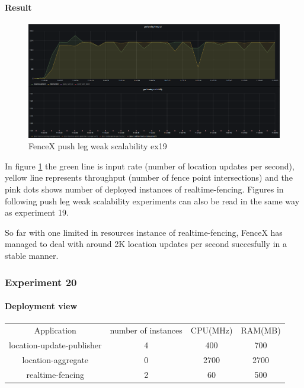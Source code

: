 \documentclass[a4]{report}
\begin{document}
    \paragraph{Result}
    \begin{figure}[ht]
        \caption{FenceX push leg weak scalability ex19}
        \label{fig:ex19}
        \includegraphics[scale=0.4]{images/evaluation/ex19-benchmarking-ongoing-1per16sec.png}
    \end{figure}

    In figure \ref{fig:ex19} the green line is input rate (number of location updates per second),
    yellow line represents throughput (number of fence point intersections) and the pink dots shows number of
    deployed instances of realtime-fencing.
    Figures in following push leg weak scalability experiments can also be read in the same way as experiment 19.

    So far with one limited in resources instance of realtime-fencing, FenceX has managed to deal with around 2K
    location updates per second succesfully in a stable manner.

    \subsubsection{Experiment 20}
    \paragraph{Deployment view}
    \begin{center}
        \begin{tabular}{ c c c c }
            Application               &  number of instances     & CPU(MHz)  & RAM(MB)    \\
            location-update-publisher &          4               & 400       &   700      \\
            location-aggregate        &          0               & 2700      &   2700     \\
            realtime-fencing          &          2               & 60       &   500       \\
        \end{tabular}
    \end{center}
\end{document}
